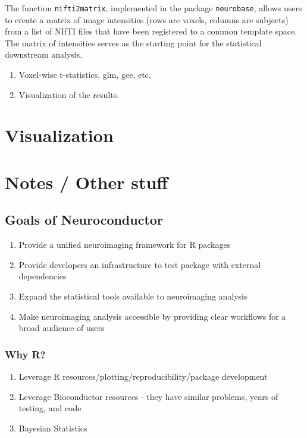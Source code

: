 \documentclass[]{elsarticle} %
\providecommand{\tightlist}{%
  \setlength{\itemsep}{0pt}\setlength{\parskip}{0pt}}
\begin{document}
The function \texttt{nifti2matrix}, implemented in the package \texttt{neurobase}, allows users to create a matrix of image intensities (rows are voxels, columns are subjects) from a list of NIfTI files that have been registered to a common template space. The matrix of intensities serves as the starting point for the statistical downstream analysis. 
  

\begin{enumerate}
\item Voxel-wise t-statistics, glm, gee, etc. 
\item Visualization of the results. 
\end{enumerate}



\section{Visualization}


\clearpage 

\section{Notes / Other stuff}

\subsection{Goals of Neuroconductor}\label{goals-of-neuroconductor}

\begin{enumerate}
\def\labelenumi{\arabic{enumi}.}
\tightlist
\item
  Provide a unified neuroimaging framework for R packages
\item
  Provide developers an infrastructure to test package with external
  dependencies
\item
  Expand the statistical tools available to neuroimaging analysis
\item
  Make neuroimaging analysis accessible by providing clear workflows for
  a broad audience of users
\end{enumerate}

\subsubsection{Why R?}\label{why-r}

\begin{enumerate}
\def\labelenumi{\arabic{enumi}.}
\setcounter{enumi}{2}
\tightlist
\item
  Leverage R resources/plotting/reproducibility/package development
\item
  Leverage Bioconductor resources - they have similar problems, years of
  testing, and code
\item
  Bayesian Statistics
\end{enumerate}
\end{document}
